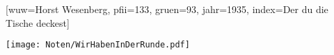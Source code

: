 [wuw={Horst Wesenberg}, pfii={133}, gruen={93}, jahr={1935}, index={Der du die Tische deckest}]

\beginverse
\endverse
\centering\texttt{[image: Noten/WirHabenInDerRunde.pdf]}

\endsong

